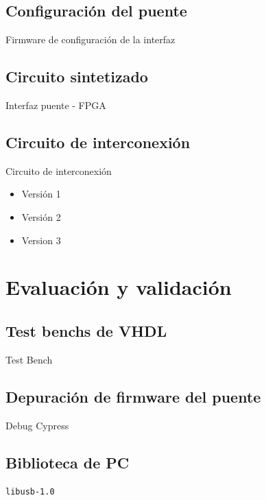 \documentclass[11pt,a4paper]{beamer}
\begin{document}
		\subsection{Configuración del puente}
			\begin{frame}{Firmware de configuración de la interfaz}
				
			\end{frame}
		\subsection{Circuito sintetizado}
			\begin{frame}{Interfaz puente - FPGA}
				
			\end{frame}
		\subsection{Circuito de interconexión}
			\begin{frame}{Circuito de interconexión}
				\begin{itemize}
					\item Versión 1
					\item Versión 2
					\item Version 3
				\end{itemize}
			\end{frame}
	\section{Evaluación y validación}
		\subsection{Test benchs de VHDL}
			\begin{frame}{Test Bench}
				
			\end{frame}
		\subsection{Depuración de firmware del puente}
			\begin{frame}{Debug Cypress}
				
			\end{frame}
		\subsection{Biblioteca de PC}
			\begin{frame}{\texttt{libusb-1.0}}
				
			\end{frame}
\end{document}
